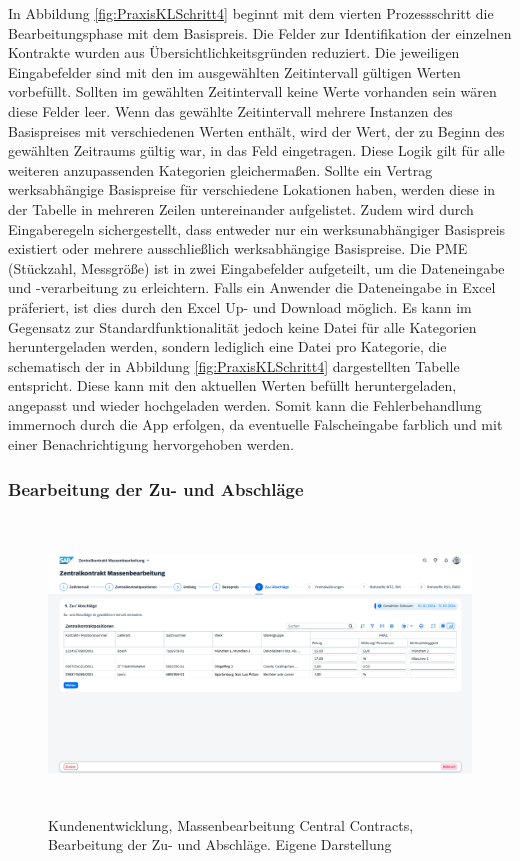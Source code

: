 In Abbildung \ref{fig:PraxisKLSchritt4} beginnt mit dem vierten Prozessschritt die Bearbeitungsphase mit dem Basispreis. Die Felder zur Identifikation der einzelnen Kontrakte wurden aus Übersichtlichkeitsgründen reduziert. Die jeweiligen Eingabefelder sind mit den im ausgewählten Zeitintervall gültigen Werten vorbefüllt. Sollten im gewählten Zeitintervall keine Werte vorhanden sein wären diese Felder leer. Wenn das gewählte Zeitintervall mehrere Instanzen des Basispreises mit verschiedenen Werten enthält, wird der Wert, der zu Beginn des gewählten Zeitraums gültig war, in das Feld eingetragen. Diese Logik gilt für alle weiteren anzupassenden Kategorien gleicherma\ss en. Sollte ein Vertrag werksabhängige Basispreise für verschiedene Lokationen haben, werden diese in der Tabelle in mehreren Zeilen untereinander aufgelistet. Zudem wird durch Eingaberegeln sichergestellt, dass entweder nur ein werksunabhängiger Basispreis existiert oder mehrere ausschlie\ss lich werksabhängige Basispreise. Die PME (Stückzahl, Messgrö\ss e) ist in zwei Eingabefelder aufgeteilt, um die Dateneingabe und -verarbeitung zu erleichtern. Falls ein Anwender die Dateneingabe in Excel präferiert, ist dies durch den Excel Up- und Download möglich. Es kann im Gegensatz zur Standardfunktionalität jedoch keine Datei für alle Kategorien heruntergeladen werden, sondern lediglich eine Datei pro Kategorie, die schematisch der in Abbildung \ref{fig:PraxisKLSchritt4} dargestellten Tabelle entspricht. Diese kann mit den aktuellen Werten befüllt heruntergeladen, angepasst und wieder hochgeladen werden. Somit kann die Fehlerbehandlung immernoch durch die App erfolgen, da eventuelle Falscheingabe farblich und mit einer Benachrichtigung hervorgehoben werden.

\subsubsection{Bearbeitung der Zu- und Abschläge}

\begin{figure}[H]
    \centering
    \includegraphics[height=7.78cm]{Bilder/Praxisteil-KL-Schritt-5.png}
    \caption[Kundenentwicklung, Massenbearbeitung Central Contracts, Bearbeitung der Zu- und Abschläge]{Kundenentwicklung, Massenbearbeitung Central Contracts, Bearbeitung der Zu- und Abschläge. Eigene Darstellung}
    \label{fig:PraxisKLSchritt5}
\end{figure}

